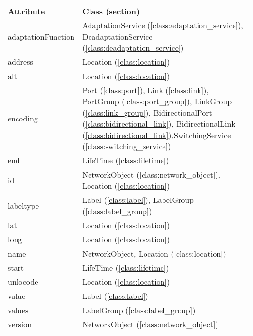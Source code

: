 \begin{tabular}{@{}p{}p{}}
\textbf{Attribute} &                                                                                   \textbf{Class (section)}\\
adaptationFunction & AdaptationService (\ref{class:adaptation_service}), DeadaptationService (\ref{class:deadaptation_service})\\
           address &                                                                            Location (\ref{class:location})\\
               alt &                                                                            Location (\ref{class:location})\\
          encoding & Port (\ref{class:port}), Link (\ref{class:link}), PortGroup (\ref{class:port_group}), LinkGroup (\ref{class:link_group}), BidirectionalPort (\ref{class:bidirectional_link}), BidirectionalLink (\ref{class:bidirectional_link}),SwitchingService (\ref{class:switching_service})\\
               end &                                                                            LifeTime (\ref{class:lifetime})\\
                id &                                NetworkObject (\ref{class:network_object}), Location (\ref{class:location})\\
         labeltype &                                            Label (\ref{class:label}), LabelGroup (\ref{class:label_group})\\
               lat &                                                                            Location (\ref{class:location})\\
              long &                                                                            Location (\ref{class:location})\\
              name &                                                             NetworkObject, Location (\ref{class:location})\\
             start &                                                                            LifeTime (\ref{class:lifetime})\\
          unlocode &                                                                            Location (\ref{class:location})\\
             value &                                                                                  Label (\ref{class:label})\\
            values &                                                                       LabelGroup (\ref{class:label_group})\\
           version &                                                                 NetworkObject (\ref{class:network_object})\\
\end{tabular}


